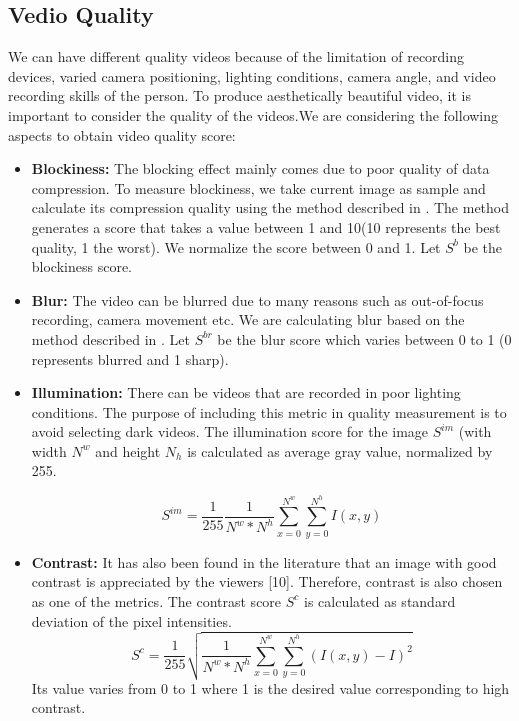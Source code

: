 \documentclass{sig-alternate}
\begin{document}
\subsection{Vedio Quality}
We can have different quality videos because of the limitation of recording devices, varied camera positioning, lighting conditions, camera angle, and video recording skills of the person. To produce aesthetically beautiful video, it is important to consider the quality of the videos.We are considering the following aspects to obtain video quality score:
\begin{itemize}
\item \textbf{Blockiness:} The blocking effect mainly comes due to poor quality of data compression. To measure blockiness, we take current image as sample and calculate its compression quality using the method described in \cite{carter2007ceramic}. The method generates  a score that takes a value between 1 and 10(10 represents the best quality, 1 the worst). We normalize the score between 0 and 1. Let \(S^b\) be the blockiness score. 
\item \textbf{Blur:} The video can be blurred due to many reasons such as out-of-focus recording, camera movement etc. We are calculating blur based on the method described in \cite{cabrera2001path}. Let \(S^{br}\) be the blur score which varies between 0 to 1 (0 represents blurred and 1 sharp). 
\item \textbf{Illumination:} There can be videos that are recorded in poor lighting conditions. The purpose of including this metric in quality measurement is to avoid selecting dark videos. The illumination score for the image \(S^{im}\) (with width \(N^w\) and height \(N_h\) is calculated as average gray value, normalized by 255.

\begin{equation}
 S^{im} = \frac{1}{255}\frac{1}{N^w * N^h}\sum_{x=0}^{N^w}\sum_{y=0}^{N^h}I(x,y) 
\end{equation}
\item \textbf{Contrast:} It has also been found in the literature that an image with good contrast is appreciated by the viewers [10]. Therefore, contrast is also chosen as one of the metrics. The contrast score \(S^c\) is calculated as standard deviation of the pixel intensities.
\begin{equation}
S^c = \frac{1}{255} \sqrt{\frac{1}{N^w * N^h}\sum_{x=0}^{N^w}\sum_{y=0}^{N^h}(I(x,y) - I)^2}
\end{equation}
Its value varies from 0 to 1 where 1 is the desired value corresponding to high contrast.


\end{itemize}
\end{document}
